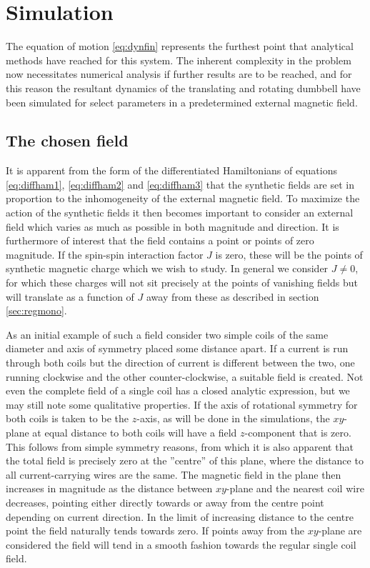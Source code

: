 \documentclass[main.tex]{subfiles}
\begin{document}
\section{Simulation}\label{sec:simulation}
The equation of motion \ref{eq:dynfin} represents the furthest point that analytical
methods have
reached for this system. The inherent complexity in the problem now necessitates numerical
analysis if further results are to be reached, and for this reason the resultant dynamics
of the translating and rotating dumbbell have been simulated for select parameters in a predetermined external magnetic field.

\subsection{The chosen field}\label{sec:chofield}
It is apparent from the form of the differentiated Hamiltonians of equations
\ref{eq:diffham1}, \ref{eq:diffham2} and \ref{eq:diffham3} that the synthetic fields are
set in proportion to the inhomogeneity of the external magnetic field. To maximize the
action of the synthetic fields it then becomes important to consider an external field
which varies as much as possible in both magnitude and direction. It is furthermore of
interest that the field contains a point or points of zero magnitude. If the spin-spin
interaction factor \(J\) is zero, these will be the points of synthetic magnetic charge
which we wish to study. In general we consider \(J \ne 0\), for which these charges will
not sit precisely at the points of vanishing fields but will translate as a function of
\(J\) away from these as described in section \ref{sec:regmono}.

As an initial example of such a field consider two simple coils of the same diameter and
axis of symmetry placed some distance apart. If a current is run through both coils but
the direction of current is different between the two, one running clockwise and the other
counter-clockwise, a suitable field is created. Not even the complete field of a single
coil has a closed analytic expression, but we may still note some qualitative properties.
If the axis of rotational symmetry for both coils is taken to be the \(z\)-axis, as will be
done in the simulations, the \(xy\)-plane at equal distance to both coils will have a field
\(z\)-component that is zero. This follows from simple symmetry reasons, from which it is
also apparent that the total field is precisely zero at the ''centre'' of this plane, where
the distance to all current-carrying wires are the same. The magnetic field in the plane then increases
in magnitude as the distance between \(xy\)-plane and the nearest coil wire decreases,
pointing either directly towards or away from the centre point depending on current
direction. In the limit of increasing distance to the centre point the field naturally
tends towards zero. If points away from the \(xy\)-plane are considered the field will tend
in a smooth fashion towards the regular single coil field.
\end{document}
